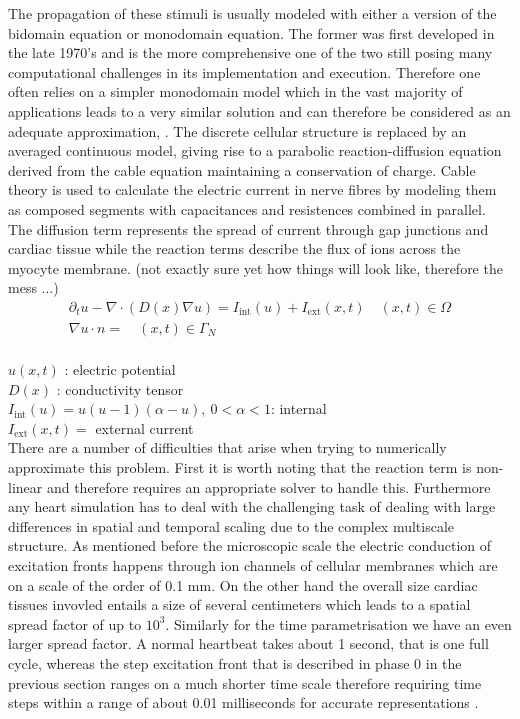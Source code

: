 \documentclass[../draft_1.tex]{subfiles}
\begin{document}
The propagation of these stimuli is usually modeled with either a version of the bidomain equation or monodomain equation. The former was first developed in the late 1970's and is the more comprehensive one of the two still posing many computational challenges in its implementation and execution. Therefore one often relies on a simpler monodomain model which in the vast majority of applications leads to a very similar solution and can therefore be considered as an adequate approximation, \cite{potse2006comparison}. The discrete cellular structure is replaced by an averaged continuous model, giving rise to a parabolic reaction-diffusion equation derived from the cable equation maintaining a conservation of charge. Cable theory is used to calculate the electric current in nerve fibres by modeling them as composed segments with capacitances and resistences combined in parallel. 
The diffusion term represents the spread of current through gap junctions and cardiac tissue while the reaction terms describe the flux of ions across the myocyte membrane.  (not exactly sure yet how things will look like, therefore the mess ...)
\begin{equation}
\begin{aligned}
\partial_t u - \nabla \cdot ( D(x) \nabla u) = I_{\text{int}}(u) + I_{\text{ext}}(x,t)  \quad  (x,t) \in \Omega \\
\nabla u \cdot n = \quad (x,t) \in \Gamma_N \\
\end{aligned}
\end{equation}

$u(x,t)$ : electric potential \\
$D(x) $  : conductivity tensor \\
$ I_{\text{int}}(u) = u (u - 1 )(\alpha - u), \ 0 < \alpha < 1$: internal \\
$I_{\text{ext}}(x,t) = $ external current \\

There are a number of difficulties that arise when trying to numerically approximate this problem. First it is worth noting that the reaction term is non-linear and therefore requires an appropriate solver to handle this. Furthermore any heart simulation has to deal with the challenging task of dealing with large differences in spatial and temporal scaling due to the complex multiscale structure. As mentioned before the microscopic scale the electric conduction of excitation fronts happens through ion channels of cellular membranes which are on a scale of the order of 0.1 mm. On the other hand the overall size cardiac tissues invovled entails a size of several centimeters which leads to a spatial spread factor of up to $10^3$. Similarly for the time parametrisation we have an even larger spread factor. A normal heartbeat takes about 1 second, that is one full cycle, whereas the step excitation front that is described in phase 0 in the previous section ranges on a much shorter time scale therefore requiring time steps within a range of about 0.01 milliseconds for accurate representations \cite{colli2004parallel}.
\end{document}

